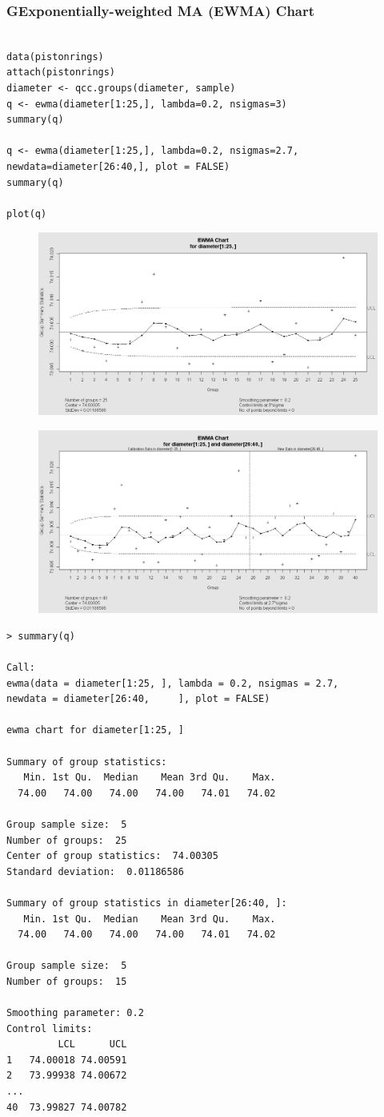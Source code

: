 \documentclass[MASTER-SPC.tex]{subfiles}
\begin{document}
\subsubsection{GExponentially-weighted MA (EWMA) Chart}
\begin{framed}
\begin{verbatim}

data(pistonrings)
attach(pistonrings)
diameter <- qcc.groups(diameter, sample)
q <- ewma(diameter[1:25,], lambda=0.2, nsigmas=3)
summary(q)

q <- ewma(diameter[1:25,], lambda=0.2, nsigmas=2.7,
newdata=diameter[26:40,], plot = FALSE)
summary(q)

plot(q)
\end{verbatim}
\end{framed}

\begin{figure}[h!]
\centering
\includegraphics[width=0.6\linewidth]{./qccEWMA1}
\caption{}
\label{fig:qccEWMA1}
\end{figure}
\begin{figure}[h!]
\centering
\includegraphics[width=0.6\linewidth]{./qccEWMA2}
\caption{}
\label{fig:qccEWMA2}
\end{figure}
\begin{verbatim}
> summary(q)

Call:
ewma(data = diameter[1:25, ], lambda = 0.2, nsigmas = 2.7, 
newdata = diameter[26:40,     ], plot = FALSE)

ewma chart for diameter[1:25, ] 

Summary of group statistics:
   Min. 1st Qu.  Median    Mean 3rd Qu.    Max. 
  74.00   74.00   74.00   74.00   74.01   74.02 

Group sample size:  5
Number of groups:  25
Center of group statistics:  74.00305
Standard deviation:  0.01186586 

Summary of group statistics in diameter[26:40, ]:
   Min. 1st Qu.  Median    Mean 3rd Qu.    Max. 
  74.00   74.00   74.00   74.00   74.01   74.02 

Group sample size:  5
Number of groups:  15 

Smoothing parameter: 0.2 
Control limits:
         LCL      UCL
1   74.00018 74.00591
2   73.99938 74.00672
...                  
40  73.99827 74.00782

\end{verbatim}
\newpage
\end{document}
